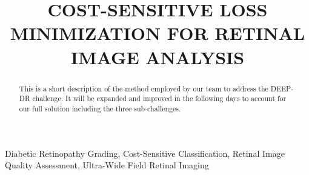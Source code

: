\documentclass{article}
\title{COST-SENSITIVE LOSS MINIMIZATION FOR RETINAL IMAGE ANALYSIS}
\begin{document}
%
\maketitle
%
\begin{abstract}
This is a short description of the method employed by our team to address the DEEP-DR challenge. It will be expanded and improved in the following days to account for our full solution including the three sub-challenges.
\end{abstract}
%
\begin{keywords}
Diabetic Retinopathy Grading, Cost-Sensitive Classification, Retinal Image Quality Assessment, Ultra-Wide Field Retinal Imaging
\end{keywords}






%
%
%
%
%
%

%


%
%

\end{document}
